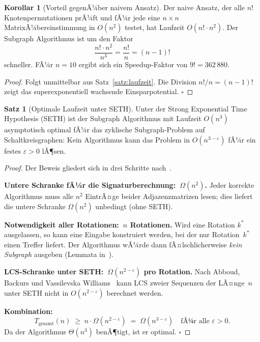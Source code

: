 ﻿\documentclass[a4paper,12pt]{article}
\theoremstyle{definition}
\newtheorem{satz}{Satz}
\newtheorem{korollar}{Korollar}
\begin{document}
\begin{korollar}[Vorteil gegenÃ¼ber naivem Ansatz]
  \label{kor:speedup}
  Der naive Ansatz, der alle $n!$ Knotenpermu\-tationen prÃ¼ft und fÃ¼r
  jede eine $n \times n$ MatrixÃ¼bereinstimmung in $O(n^2)$ testet,
  hat Laufzeit $O(n!\cdot n^2)$. Der Subgraph Algorithmus ist um den
  Faktor
  \[
    \frac{n!\cdot n^2}{n^3} = \frac{n!}{n} = (n-1)!
  \]
  schneller. FÃ¼r $n=10$ ergibt sich ein Speedup-Faktor von
  $9! = 362\,880$.
\end{korollar}

\begin{proof}
  Folgt unmittelbar aus Satz~\ref{satz:laufzeit}.
  Die Division $n!/n = (n-1)!$ zeigt das superexponentiell wachsende
  Einsparpotential. $\square$
\end{proof}

\begin{satz}[Optimale Laufzeit unter SETH]
  \label{satz:seth}
  Unter der Strong Exponential Time Hypothesis (SETH) ist der
  Subgraph Algorithmus mit Laufzeit $O(n^3)$ asymptotisch optimal
  fÃ¼r das zyklische Subgraph-Problem auf Schaltkreisgraphen:
  Kein Algorithmus kann das Problem in $O(n^{3-\varepsilon})$ fÃ¼r
  ein festes $\varepsilon > 0$ lÃ¶sen.
\end{satz}

\begin{proof}
  Der Beweis gliedert sich in drei Schritte nach~\cite{epp2026subgraph}.

  \textbf{Untere Schranke fÃ¼r die Signaturberechnung:~$\Omega(n^2)$.}
  Jeder korrekte Algorithmus muss alle $n^2$ EintrÃ¤ge beider
  Adjazenz\-matrizen lesen; dies liefert die untere Schranke
  $\Omega(n^2)$ unbedingt (ohne SETH).

  \textbf{Notwendigkeit aller Rotationen:~$n$ Rotationen.}
  Wird eine Rotation $k^*$ ausgelassen, so kann eine Eingabe
  konstruiert werden, bei der nur Rotation~$k^*$ einen Treffer
  liefert. Der Algorithmus wÃ¼rde dann fÃ¤lschlicherweise \emph{kein
  Subgraph} ausgeben (Lemmata in~\cite{epp2026subgraph}).

  \textbf{LCS-Schranke unter SETH:~$\Omega(n^{2-\varepsilon})$
  pro Rotation.}
  Nach Abboud, Backurs und Vassilevska Williams~\cite{abboud2015tight}
  kann LCS zweier Sequenzen der LÃ¤nge~$n$ unter SETH nicht in
  $O(n^{2-\varepsilon})$ berechnet werden.

  \textbf{Kombination:}
  \[
    T_{\mathrm{gesamt}}(n)
    \;\geq\; n \cdot \Omega(n^{2-\varepsilon})
    \;=\; \Omega(n^{3-\varepsilon})
    \quad\text{fÃ¼r alle } \varepsilon>0.
  \]
  Da der Algorithmus $\Theta(n^3)$ benÃ¶tigt, ist er optimal. $\square$
\end{proof}
\end{document}
